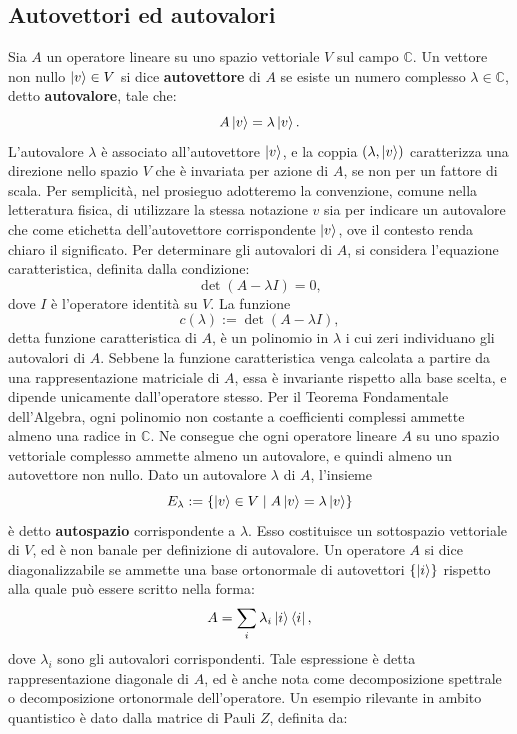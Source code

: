 \documentclass[a4paper,12pt]{report}
\theoremstyle{plain}
\begin{document}
\subsection{Autovettori ed autovalori}
Sia \( A \) un operatore lineare su uno spazio vettoriale \( V \) sul campo \( \mathbb{C} \). Un vettore non nullo \( \ket{v} \in V \) si dice \textbf{autovettore} di \( A \) se esiste un numero complesso \( \lambda \in \mathbb{C} \), detto \textbf{autovalore}, tale che:
\[
A\ket{v} = \lambda\ket{v}.
\]
L'autovalore \( \lambda \) è associato all'autovettore \( \ket{v} \), e la coppia \( (\lambda, \ket{v}) \) caratterizza una direzione nello spazio \( V \) che è invariata per azione di \( A \), se non per un fattore di scala.
Per semplicità, nel prosieguo adotteremo la convenzione, comune nella letteratura fisica, di utilizzare la stessa notazione \( v \) sia per indicare un autovalore che come etichetta dell'autovettore corrispondente \( \ket{v} \), ove il contesto renda chiaro il significato.
Per determinare gli autovalori di \( A \), si considera l'equazione caratteristica, definita dalla condizione:
\[
\det(A - \lambda I) = 0,
\]
dove \( I \) è l'operatore identità su \( V \). La funzione
\[
c(\lambda) := \det(A - \lambda I),
\]
detta funzione caratteristica di \( A \), è un polinomio in \( \lambda \) i cui zeri individuano gli autovalori di \( A \). Sebbene la funzione caratteristica venga calcolata a partire da una rappresentazione matriciale di \( A \), essa è invariante rispetto alla base scelta, e dipende unicamente dall'operatore stesso.
Per il Teorema Fondamentale dell'Algebra, ogni polinomio non costante a coefficienti complessi ammette almeno una radice in \( \mathbb{C} \). Ne consegue che ogni operatore lineare \( A \) su uno spazio vettoriale complesso ammette almeno un autovalore, e quindi almeno un autovettore non nullo.
Dato un autovalore \( \lambda \) di \( A \), l'insieme
\[
E_{\lambda} := \{\ket{v} \in V \mid A\ket{v} = \lambda\ket{v}\}
\]
è detto \textbf{autospazio} corrispondente a \( \lambda \). Esso costituisce un sottospazio vettoriale di \( V \), ed è non banale per definizione di autovalore.
Un operatore \( A \) si dice diagonalizzabile se ammette una base ortonormale di autovettori \(\{\ket{i}\}\) rispetto alla quale può essere scritto nella forma:
\[
A = \sum_i \lambda_i \ket{i}\bra{i},
\]
dove \(\lambda_i\) sono gli autovalori corrispondenti. Tale espressione è detta rappresentazione diagonale di \(A\), ed è anche nota come decomposizione spettrale o decomposizione ortonormale dell'operatore.
Un esempio rilevante in ambito quantistico è dato dalla matrice di Pauli \(Z\), definita da:
\end{document}
